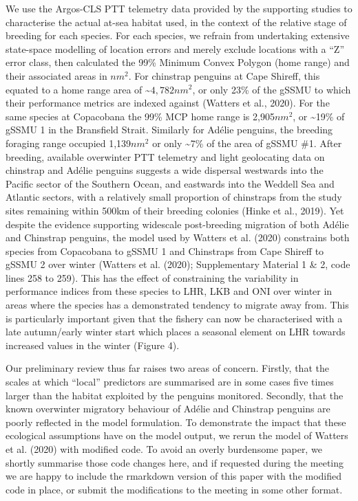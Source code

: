 \documentclass[]{elsarticle} %
\begin{document}
We use the Argos-CLS PTT telemetry data provided by the supporting
studies to characterise the actual at-sea habitat used, in the context
of the relative stage of breeding for each species. For each species, we
refrain from undertaking extensive state-space modelling of location
errors and merely exclude locations with a ``Z'' error class, then
calculated the 99\% Minimum Convex Polygon (home range) and their
associated areas in \(nm^2\). For chinstrap penguins at Cape Shireff,
this equated to a home range area of \textasciitilde{}\(4,782nm^2\), or
only 23\% of the gSSMU to which their performance metrics are indexed
against (Watters et al., 2020). For the same species at Copacobana the
99\% MCP home range is 2,905\(nm^2\), or \textasciitilde19\% of gSSMU 1
in the Bransfield Strait. Similarly for Adélie penguins, the breeding
foraging range occupied 1,139\(nm^2\) or only \textasciitilde7\% of the
area of gSSMU \#1. After breeding, available overwinter PTT telemetry
and light geolocating data on chinstrap and Adélie penguins suggests a
wide dispersal westwards into the Pacific sector of the Southern Ocean,
and eastwards into the Weddell Sea and Atlantic sectors, with a
relatively small proportion of chinstraps from the study sites remaining
within 500km of their breeding colonies (Hinke et al., 2019). Yet
despite the evidence supporting widescale post-breeding migration of
both Adélie and Chinstrap penguins, the model used by Watters et al.
(2020) constrains both species from Copacobana to gSSMU 1 and Chinstraps
from Cape Shireff to gSSMU 2 over winter (Watters et al. (2020);
Supplementary Material 1 \& 2, code lines 258 to 259). This has the
effect of constraining the variability in performance indices from these
species to LHR, LKB and ONI over winter in areas where the species has a
demonstrated tendency to migrate away from. This is particularly
important given that the fishery can now be characterised with a late
autumn/early winter start which places a seasonal element on LHR towards
increased values in the winter (Figure 4).

Our preliminary review thus far raises two areas of concern. Firstly,
that the scales at which ``local'' predictors are summarised are in some
cases five times larger than the habitat exploited by the penguins
monitored. Secondly, that the known overwinter migratory behaviour of
Adélie and Chinstrap penguins are poorly reflected in the model
formulation. To demonstrate the impact that these ecological assumptions
have on the model output, we rerun the model of Watters et al. (2020)
with modified code. To avoid an overly burdensome paper, we shortly
summarise those code changes here, and if requested during the meeting
we are happy to include the rmarkdown version of this paper with the
modified code in place, or submit the modifications to the meeting in
some other format.
\end{document}
